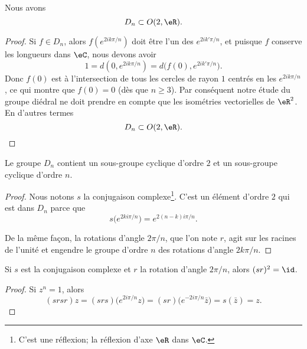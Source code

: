 \begin{lemma}       \label{LEMooCUVPooMZKnzo}
	Nous avons
	\begin{equation}
		D_n\subset O(2,\eR).
	\end{equation}
\end{lemma}

\begin{proof}
	Si \( f\in D_n\), alors \( f( e^{2ik\pi/n}) \) doit être l'un des \(  e^{2ik'\pi/n}\), et puisque \( f\) conserve les longueurs dans \( \eC\), nous devons avoir
	\begin{equation}
		1=d(0, e^{2ik\pi/n})=d\big( f(0), e^{2ik'\pi/n} \big).
	\end{equation}
	Donc \( f(0)\) est à l'intersection de tous les cercles de rayon \( 1\) centrés en les \(  e^{2ik\pi/n}\), ce qui montre que \( f(0)=0\) (dès que \( n\geq 3\)). Par conséquent notre étude du groupe diédral ne doit prendre en compte que les isométries vectorielles de \( \eR^2\). En d'autres termes
	\begin{equation}
		D_n\subset O(2,\eR).
	\end{equation}
\end{proof}

\begin{proposition}      \label{PROPooELOIooVJtuZN}
	Le groupe \( D_n\) contient un sous-groupe cyclique d'ordre \( 2\) et un sous-groupe cyclique d'ordre \( n\).
\end{proposition}

\begin{proof}
	Nous notons \( s\) la conjugaison complexe\footnote{C'est une réflexion; la réflexion d'axe \( \eR\) dans \( \eC\).}. C'est un élément d'ordre \( 2\) qui est dans \( D_n\) parce que
	\begin{equation}    \label{EqSUshknP}
		s\big(  e^{2ki\pi/n} \big)= e^{2(n-k)i\pi/n}.
	\end{equation}

	De la même façon, la rotations d'angle \(2\pi/n\), que l'on note \( r\), agit sur les racines de l'unité et engendre le groupe d'ordre \( n\) des rotations d'angle \(2 k\pi/n\).
\end{proof}

\begin{proposition}
	Si \( s\) est la conjugaison complexe et \( r\) la rotation d'angle \( 2\pi/n\), alors \( (sr)^2=\id\).
\end{proposition}

\begin{proof}
	Si \( z^n=1\), alors
	\begin{equation}
		(srsr)z=(srs)\big(  e^{2 i\pi/n}z \big)=(sr)\big(  e^{-2i\pi /n}\bar z \big)=s(\bar z)=z.
	\end{equation}
\end{proof}

